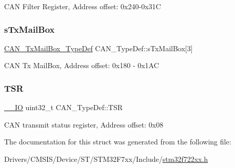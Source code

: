 C\+AN Filter Register, Address offset\+: 0x240-\/0x31C \mbox{\label{struct_c_a_n___type_def_a328925e230f68a775f6f4ad1076c27ce}} 
\subsubsection{\texorpdfstring{sTxMailBox}{sTxMailBox}}
{\footnotesize\ttfamily \mbox{\hyperlink{struct_c_a_n___tx_mail_box___type_def}{C\+A\+N\+\_\+\+Tx\+Mail\+Box\+\_\+\+Type\+Def}} C\+A\+N\+\_\+\+Type\+Def\+::s\+Tx\+Mail\+Box\mbox{[}3\mbox{]}}

C\+AN Tx Mail\+Box, Address offset\+: 0x180 -\/ 0x1\+AC \mbox{\label{struct_c_a_n___type_def_acbc82ac4e87e75350fc586be5e56d95b}} 
\subsubsection{\texorpdfstring{TSR}{TSR}}
{\footnotesize\ttfamily \mbox{\hyperlink{core__sc300_8h_aec43007d9998a0a0e01faede4133d6be}{\+\_\+\+\_\+\+IO}} uint32\+\_\+t C\+A\+N\+\_\+\+Type\+Def\+::\+T\+SR}

C\+AN transmit status register, Address offset\+: 0x08 

The documentation for this struct was generated from the following file\+:\begin{DoxyCompactItemize}
\item 
Drivers/\+C\+M\+S\+I\+S/\+Device/\+S\+T/\+S\+T\+M32\+F7xx/\+Include/\mbox{\hyperlink{stm32f722xx_8h}{stm32f722xx.\+h}}\end{DoxyCompactItemize}
